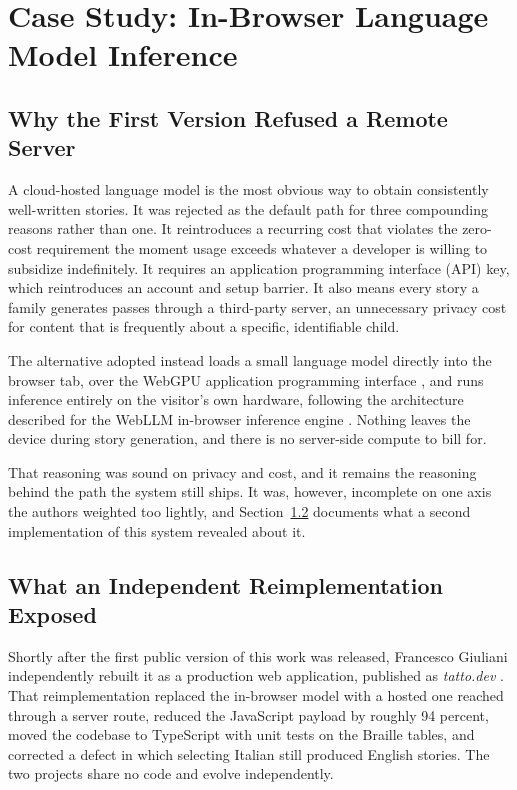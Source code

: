 \documentclass[conference]{IEEEtran}
\begin{document}
\section{Case Study: In-Browser Language Model Inference}\label{sec:llm}

\subsection{Why the First Version Refused a Remote Server}

A cloud-hosted language model is the most obvious way to obtain consistently well-written stories. It was rejected as the default path for three compounding reasons rather than one. It reintroduces a recurring cost that violates the zero-cost requirement the moment usage exceeds whatever a developer is willing to subsidize indefinitely. It requires an application programming interface (API) key, which reintroduces an account and setup barrier. It also means every story a family generates passes through a third-party server, an unnecessary privacy cost for content that is frequently about a specific, identifiable child.

The alternative adopted instead loads a small language model directly into the browser tab, over the WebGPU application programming interface \cite{w3cwebgpu}, and runs inference entirely on the visitor's own hardware, following the architecture described for the WebLLM in-browser inference engine \cite{webllm}. Nothing leaves the device during story generation, and there is no server-side compute to bill for.

That reasoning was sound on privacy and cost, and it remains the reasoning behind the path the system still ships. It was, however, incomplete on one axis the authors weighted too lightly, and Section~\ref{sec:hosted} documents what a second implementation of this system revealed about it.

\subsection{What an Independent Reimplementation Exposed}\label{sec:hosted}

Shortly after the first public version of this work was released, Francesco Giuliani independently rebuilt it as a production web application, published as \emph{tatto.dev} \cite{tattodev}. That reimplementation replaced the in-browser model with a hosted one reached through a server route, reduced the JavaScript payload by roughly 94 percent, moved the codebase to TypeScript with unit tests on the Braille tables, and corrected a defect in which selecting Italian still produced English stories. The two projects share no code and evolve independently.
\end{document}
